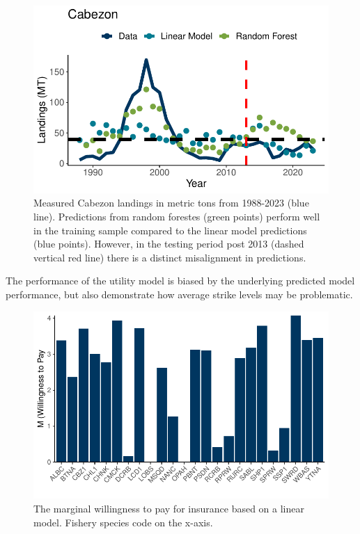 \documentclass[
  letterpaper,
  DIV=11,
  numbers=noendperiod]{scrartcl}
\begin{document}
\begin{figure}

{\centering \includegraphics{ibi-ml_files/figure-pdf/fig-cab-1.pdf}

}

\caption{\label{fig-cab}Measured Cabezon landings in metric tons from
1988-2023 (blue line). Predictions from random forestes (green points)
perform well in the training sample compared to the linear model
predictions (blue points). However, in the testing period post 2013
(dashed vertical red line) there is a distinct misalignment in
predictions.}

\end{figure}

The performance of the utility model is biased by the underlying
predicted model performance, but also demonstrate how average strike
levels may be problematic.

\begin{figure}

{\centering \includegraphics{ibi-ml_files/figure-pdf/fig-ut-1.pdf}

}

\caption{\label{fig-ut}The marginal willingness to pay for insurance
based on a linear model. Fishery species code on the x-axis.}

\end{figure}
\end{document}

